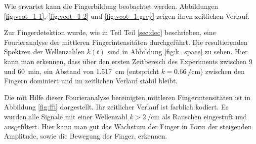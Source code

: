 Wie erwartet kann die Fingerbildung beobachtet werden. Abbildungen \ref{fig:vcot_1-1}, \ref{fig:vcot_1-2} und \ref{fig:vcot_1-grey} zeigen ihren zeitlichen Verlauf.




Zur Fingerdetektion wurde, wie in Teil Teil \ref{sec:dec} beschrieben, eine Fourieranalyse der mittleren Fingerintensitäten durchgeführt. Die resultierenden Spektren der Wellenzahlen $k(t)$ sind in Abbildung \ref{fig:k_space} zu sehen. Hier kann man erkennen, dass über den ersten Zeitbereich des Experiments zwischen 9 und \SI{60}{\minute}, ein Abstand von \SI[round-precision=2]{1,517}{\centi\meter} (entspricht $k=\SI[round-precision=2]{0,66}{\per\centi\meter}$) zwischen den Fingern dominiert und im zeitlichen Verlauf stabil bleibt. 

Die mit Hilfe dieser Fourieranalyse bereinigten mittleren Fingerintensitäten ist in Abbildung \ref{fig:fft} dargestellt. Ihr zeitlicher Verlauf ist farblich kodiert. Es wurden alle Signale mit einer Wellenzahl $k > \SI{2}{\per\centi\meter}$ als Rauschen eingestuft und ausgefiltert. Hier kann man gut das Wachstum der Finger in Form der steigenden Amplitude, sowie die Bewegung der Finger, erkennen. %



